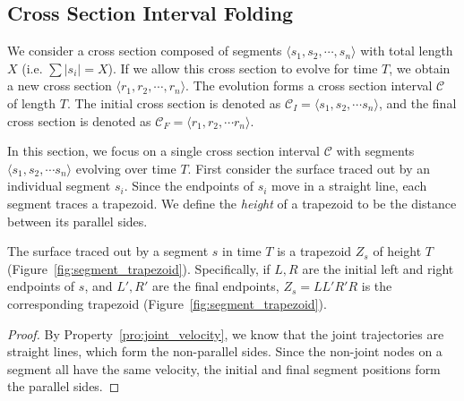 \subsection{Cross Section Interval Folding}
\label{sec:interval_folding}

\begin{definition}
\label{def:interval}
We consider a cross section composed of segments $ \langle s_1,s_2,\cdots,s_n \rangle$
with total length $X$ (i.e. $\sum \left| s_i\right| = X$).
If we allow this cross section to evolve for time $T$, we obtain a new cross section $\langle r_1,r_2,\cdots ,r_n \rangle$.
The evolution forms a cross section interval $\mathcal C$ of length $T$.
The initial cross section is denoted as $\mathcal C_I = \langle s_1, s_2,\cdots s_n \rangle$,
and the final cross section is denoted as $\mathcal C_F = \langle r_1, r_2,\cdots r_n \rangle$.
\end{definition}



In this section, we focus on a single cross section interval $\mathcal C$ with segments $\langle s_1, s_2,\cdots s_n \rangle$ evolving over time $T$.
First consider the surface traced out by an individual segment $s_i$.
Since the endpoints of $s_i$ move in a straight line, each segment traces a trapezoid.
We define the \emph{height} of a trapezoid to be the distance between its parallel sides.

\begin{lemma}
\label{lem:trapezoid}
The surface traced out by a segment $s$ in time $T$ is a trapezoid $Z_s$ of height $T$ (Figure~\ref{fig:segment_trapezoid}).
Specifically, if $L,R$ are the initial left and right endpoints of $s$, and $L',R'$ are the final endpoints,
$Z_s = LL'R'R$ is the corresponding trapezoid (Figure~\ref{fig:segment_trapezoid}).
\end{lemma}
\begin{proof}
By Property~\ref{pro:joint_velocity}, we know that the joint trajectories are straight lines, which form the non-parallel sides.
Since the non-joint nodes on a segment all have the same velocity, the initial and final segment positions form the parallel sides.
\end{proof}

